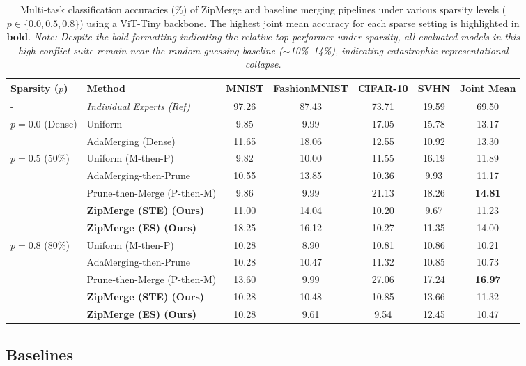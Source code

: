 \begin{table}[t]
\caption{Multi-task classification accuracies (\%) of ZipMerge and baseline merging pipelines under various sparsity levels ($p \in \{0.0, 0.5, 0.8\}$) using a ViT-Tiny backbone. The highest joint mean accuracy for each sparse setting is highlighted in \textbf{bold}. \textit{Note: Despite the bold formatting indicating the relative top performer under sparsity, all evaluated models in this high-conflict suite remain near the random-guessing baseline ($\sim$10\%--14\%), indicating catastrophic representational collapse.}}
\label{tab:main_results}
\centering
\begin{tabular}{llccccc}
\toprule
\textbf{Sparsity ($p$)} & \textbf{Method} & \textbf{MNIST} & \textbf{FashionMNIST} & \textbf{CIFAR-10} & \textbf{SVHN} & \textbf{Joint Mean} \\
\midrule
- & \emph{Individual Experts (Ref)} & 97.26 & 87.43 & 73.71 & 19.59 & 69.50 \\
\midrule
$p=0.0$ (Dense) & Uniform & 9.85 & 9.99 & 17.05 & 15.78 & 13.17 \\
& AdaMerging (Dense) & 11.65 & 18.06 & 12.55 & 10.92 & 13.30 \\
\midrule
$p=0.5$ (50\%) & Uniform (M-then-P) & 9.82 & 10.00 & 11.55 & 16.19 & 11.89 \\
& AdaMerging-then-Prune & 10.55 & 13.85 & 10.36 & 9.93 & 11.17 \\
& Prune-then-Merge (P-then-M) & 9.86 & 9.99 & 21.13 & 18.26 & \textbf{14.81} \\
& \textbf{ZipMerge (STE) (Ours)} & 11.00 & 14.04 & 10.20 & 9.67 & 11.23 \\
& \textbf{ZipMerge (ES) (Ours)} & 18.25 & 16.12 & 10.27 & 11.35 & 14.00 \\
\midrule
$p=0.8$ (80\%) & Uniform (M-then-P) & 10.28 & 8.90 & 10.81 & 10.86 & 10.21 \\
& AdaMerging-then-Prune & 10.28 & 10.47 & 11.32 & 10.85 & 10.73 \\
& Prune-then-Merge (P-then-M) & 13.60 & 9.99 & 27.06 & 17.24 & \textbf{16.97} \\
& \textbf{ZipMerge (STE) (Ours)} & 10.28 & 10.48 & 10.85 & 13.66 & 11.32 \\
& \textbf{ZipMerge (ES) (Ours)} & 10.28 & 9.61 & 9.54 & 12.45 & 10.47 \\
\bottomrule
\end{tabular}
\end{table}

\subsection{Baselines}


